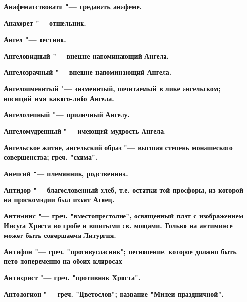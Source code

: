 \bfseries Анафематствовати \normalfont{} "--- предавать анафеме. 




\bfseries Анахорет \normalfont{} "--- отшельник. 




\bfseries Ангел \normalfont{} "--- вестник. 




\bfseries Ангеловидный \normalfont{} "--- внешне напоминающий Ангела. 




\bfseries Ангелозрачный \normalfont{} "--- внешне напоминающий Ангела. 




\bfseries Ангелоименитый \normalfont{} "--- знаменитый, почитаемый в лике ангельском; носящий имя какого-либо Ангела. 




\bfseries Ангелолепный \normalfont{} "--- приличный Ангелу. 




\bfseries Ангеломудренный \normalfont{} "--- имеющий мудрость Ангела. 




\bfseries Ангельское житие, ангельский образ \normalfont{} "--- высшая степень монашеского совершенства; греч. "схима". 




\bfseries Анепсий \normalfont{} "--- племянник, родственник. 




\bfseries Антидор \normalfont{} "--- благословенный хлеб, т.е. остатки той просфоры, из которой на проскомидии был изъят Агнец. 




\bfseries Антиминс \normalfont{} "--- греч. "вместопрестолие", освященный плат с изображением Иисуса Христа во гробе и вшитыми св. мощами. Только на антиминсе может быть совершаема Литургия. 




\bfseries Антифон \normalfont{} "--- греч. "противугласник"; песнопение, которое должно быть пето попеременно на обоих клиросах. 




\bfseries Антихрист \normalfont{} "--- греч. "противник Христа". 




\bfseries Антологион \normalfont{} "--- греч. "Цветослов"; название "Минеи праздничной". 




